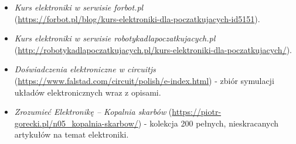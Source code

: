 % 
% 
% 
% 

\begin{itemize}
\item \emph{Kurs elektroniki w serwisie \emph{forbot.pl}}\\ (\url{https://forbot.pl/blog/kurs-elektroniki-dla-poczatkujacych-id5151}).
\item \emph{Kurs elektroniki w serwisie \emph{robotykadlapoczatkujacych.pl}}\\ (\url{http://robotykadlapoczatkujacych.pl/kurs-elektroniki-dla-poczatkujacych/}).
\item \emph{Doświadczenia elektroniczne w circuitjs} (\url{https://www.falstad.com/circuit/polish/e-index.html}) - zbiór symulacji układów elektronicznych wraz z opisami.
\item \emph{Zrozumieć Elektronikę – Kopalnia skarbów} (\url{https://piotr-gorecki.pl/n05_kopalnia-skarbow/}) - kolekcja 200 pełnych, nieskracanych artykułów na temat elektroniki.
\end{itemize}
